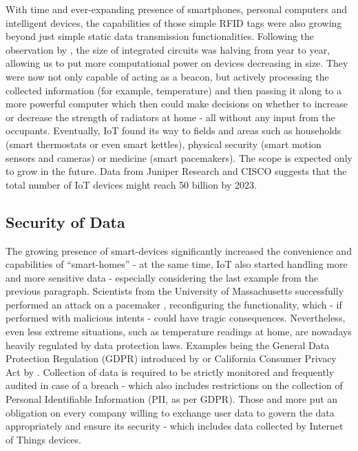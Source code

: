 With time and ever-expanding presence of smartphones, personal computers and intelligent devices, the capabilities of those simple RFID tags were also growing beyond just simple static data transmission functionalities. Following the observation by \citet{moore1965cramming}, the size of integrated circuits was halving from year to year, allowing us to put more computational power on devices decreasing in size. They were now not only capable of acting as a beacon, but actively processing the collected information (for example, temperature) and then passing it along to a more powerful computer which then could make decisions on whether to increase or decrease the strength of radiators at home - all without any input from the occupants. Eventually, IoT found its way to fields and areas such as households (smart thermostats or even smart kettles), physical security (smart motion sensors and cameras) or medicine (smart pacemakers). The scope is expected only to grow in the future. Data from Juniper Research \cite{sorrel2018internet} and CISCO \cite{evans2011internet} suggests that the total number of IoT devices might reach 50 billion by 2023.

\subsection{Security of Data}
The growing presence of smart-devices significantly increased the convenience and capabilities of ``smart-homes'' - at the same time, IoT also started handling more and more sensitive data - especially considering the last example from the previous paragraph. Scientists from the University of Massachusetts successfully performed an attack on a pacemaker \cite{4531149}, reconfiguring the functionality, which - if performed with malicious intents - could have tragic consequences. Nevertheless, even less extreme situations, such as temperature readings at home, are nowadays heavily regulated by data protection laws. Examples being the General Data Protection Regulation (GDPR) introduced by \citet{EUdataregulations2018} or California Consumer Privacy Act by \citet{CCPA}. Collection of data is required to be strictly monitored and frequently audited in case of a breach - which also includes restrictions on the collection of Personal Identifiable Information (PII, as per GDPR). Those and more put an obligation on every company willing to exchange user data to govern the data appropriately and ensure its security - which includes data collected by Internet of Things devices.

